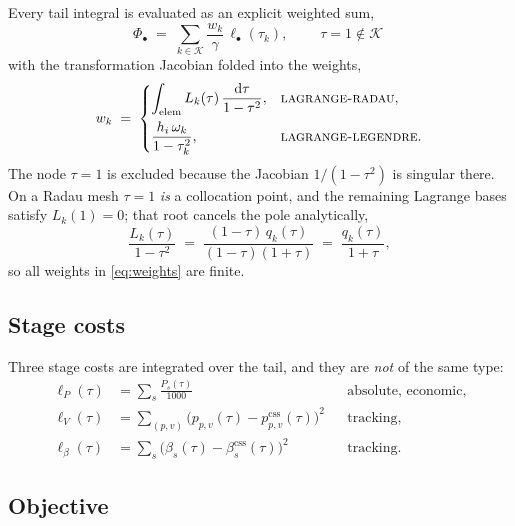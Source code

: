 \documentclass[11pt]{article}
\newcommand{\css}{\mathrm{css}}
\begin{document}
Every tail integral is evaluated as an explicit weighted sum,
%
\begin{equation}
  \Phi_\bullet \;=\; \sum_{k\in\mathcal{K}} \frac{w_k}{\gamma}\,
                     \ell_\bullet(\tau_k),
  \qquad
  \boxed{\;\tau=1 \notin \mathcal{K}\;}
  \label{eq:quad}
\end{equation}
%
with the transformation Jacobian folded into the weights,
%
\begin{equation}
  w_k \;=\;
  \begin{cases}
    \displaystyle\int_{\mathrm{elem}} L_k(\tau)\,\frac{\mathrm{d}\tau}{1-\tau^{2}},
      & \text{\textsc{lagrange-radau}},\\[2.2ex]
    \displaystyle\frac{h_i\,\omega_k}{1-\tau_k^{2}},
      & \text{\textsc{lagrange-legendre}} .
  \end{cases}
  \label{eq:weights}
\end{equation}
%
The node $\tau=1$ is excluded because the Jacobian $1/(1-\tau^{2})$ is singular
there. On a Radau mesh $\tau=1$ \emph{is} a collocation point, and the
remaining Lagrange bases satisfy $L_k(1)=0$; that root cancels the pole
analytically,
%
\begin{equation}
  \frac{L_k(\tau)}{1-\tau^{2}}
  \;=\;\frac{(1-\tau)\,q_k(\tau)}{(1-\tau)(1+\tau)}
  \;=\;\frac{q_k(\tau)}{1+\tau},
\end{equation}
%
so all weights in \eqref{eq:weights} are finite.

\subsection{Stage costs}

Three stage costs are integrated over the tail, and they are \emph{not} of the
same type:
%
\begin{align}
  \ell_P(\tau)      &= \sum_{s}\frac{P_s(\tau)}{1000}
                       &&\text{absolute, economic}, \label{eq:lP}\\
  \ell_V(\tau)      &= \sum_{(p,v)}\bigl(p_{p,v}(\tau)-p^{\css}_{p,v}(\tau)\bigr)^{2}
                       &&\text{tracking}, \\
  \ell_\beta(\tau)  &= \sum_{s}\bigl(\beta_s(\tau)-\beta^{\css}_s(\tau)\bigr)^{2}
                       &&\text{tracking}.
\end{align}

\subsection{Objective}
\end{document}
